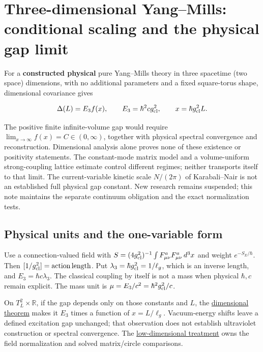 \documentclass[11pt,a4paper]{article}
\begin{document}
\hypertarget{three-dimensional-yangmills-conditional-scaling-and-the-physical-gap-limit}{%
\section{Three-dimensional Yang--Mills: conditional scaling and the
physical gap
limit}\label{three-dimensional-yangmills-conditional-scaling-and-the-physical-gap-limit}}

For a \textbf{constructed physical} pure Yang--Mills theory in three
spacetime (two space) dimensions, with no additional parameters and a
fixed square-torus shape, dimensional covariance gives

\[\Delta(L)=E_3 f(x),\qquad E_3=\hbar^2c g_{\rm cl}^2,
\qquad x=\hbar g_{\rm cl}^2L.\]

The positive finite infinite-volume gap would require
\(\lim_{x\to\infty}f(x)=C\in(0,\infty)\), together with physical
spectral convergence and reconstruction. Dimensional analysis alone
proves none of these existence or positivity statements. The
constant-mode matrix model and a volume-uniform strong-coupling lattice
estimate control different regimes; neither transports itself to that
limit. The current-variable kinetic scale \(N/(2\pi)\) of Karabali--Nair
is not an established full physical gap constant. New research remains
suspended; this note maintains the separate continuum obligation and the
exact normalization tests.

\hypertarget{physical-units-and-the-one-variable-form}{%
\subsection{Physical units and the one-variable
form}\label{physical-units-and-the-one-variable-form}}

Use a connection-valued field with
\(S=(4g_{\rm cl}^2)^{-1}\int F^a_{\mu\nu}F^a_{\mu\nu}\,d^3x\) and weight
\(e^{-S_E/\hbar}\). Then
\([1/g_{\rm cl}^2]=\mathrm{action}\,\mathrm{length}\). Put
\(\lambda_3=\hbar g_{\rm cl}^2=1/\ell_g\), which is an inverse length,
and \(E_3=\hbar c\lambda_3\). The classical coupling by itself is not a
mass when physical \(\hbar,c\) remain explicit. The mass unit is
\(\mu=E_3/c^2=\hbar^2g_{\rm cl}^2/c\).

On \(T_L^2\times\mathbb R\), if the gap depends only on those constants
and \(L\), the \href{action-unit-dimensional-selection.md}{dimensional
theorem} makes it \(E_3\) times a function of \(x=L/\ell_g\).
Vacuum-energy shifts leave a defined excitation gap unchanged; that
observation does not establish ultraviolet construction or spectral
convergence. The \href{low-dimensional-mass-gap.md}{low-dimensional
treatment} owns the field normalization and solved matrix/circle
comparisons.
\end{document}
